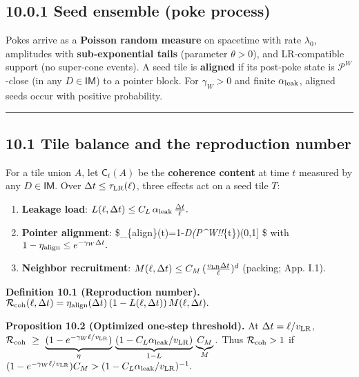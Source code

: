 \documentclass[
]{article}
\numberwithin{equation}{section}
\begin{document}
\hypertarget{seed-ensemble-poke-process}{%
\subsection{10.0.1 Seed ensemble (poke
process)}\label{seed-ensemble-poke-process}}

Pokes arrive as a \textbf{Poisson random measure} on spacetime with rate
\(\lambda_0\), amplitudes with \textbf{sub‑exponential tails} (parameter
\(\theta>0\)), and LR‑compatible support (no super‑cone events). A seed
tile is \textbf{aligned} if its post‑poke state is
\(\mathcal P^W\)-close (in any \(D\in\mathsf{IM}\)) to a pointer block.
For \(\gamma_W>0\) and finite \(\alpha_{\rm leak}\), aligned seeds occur
with positive probability.

\begin{center}\rule{0.5\linewidth}{0.5pt}\end{center}

\hypertarget{tile-balance-and-the-reproduction-number}{%
\subsection{10.1 Tile balance and the reproduction
number}\label{tile-balance-and-the-reproduction-number}}

For a tile union \(A\), let \(\mathsf C_t(A)\) be the \textbf{coherence
content} at time \(t\) measured by any \(D\in\mathsf{IM}\). Over
\(\Delta t\le \tau_{\rm LR}(\ell)\), three effects act on a seed tile
\(T\):

\begin{enumerate}
\def\labelenumi{\arabic{enumi}.}
\item
  \textbf{Leakage load}:
  \(L(\ell,\Delta t)\le C_L\,\alpha_{\rm leak}\,\tfrac{\Delta t}{\ell}.\)
\item
  \textbf{Pointer alignment}:
  \$\eta\_\{\rm align\}(\Delta t)=1-\delta\emph{D(\mathcal P\^{}W!\circ!\Phi}\{\Delta t\})\in(0,1{]}
  \$ with \(1-\eta_{\rm align}\le e^{-\gamma_W\Delta t}.\)
\item
  \textbf{Neighbor recruitment}:
  \(M(\ell,\Delta t)\le C_M\,(\tfrac{v_{\rm LR}\Delta t}{\ell})^d\)
  (packing; App. I.1).
\end{enumerate}

\textbf{Definition 10.1 (Reproduction number).}
\(\mathcal R_{\rm coh}(\ell,\Delta t)=\eta_{\rm align}(\Delta t)\,(1-L(\ell,\Delta t))\,M(\ell,\Delta t).\)

\textbf{Proposition 10.2 (Optimized one‑step threshold).} At
\(\Delta t=\ell/v_{\rm LR}\),
\(\mathcal R_{\rm coh}\ \ge\ \underbrace{(1-e^{-\gamma_W\ell/v_{\rm LR}})}_{\eta}\,\underbrace{(1-C_L\alpha_{\rm leak}/v_{\rm LR})}_{1-L}\,\underbrace{C_M}_{M}.\)
Thus \(\mathcal R_{\rm coh}>1\) if
\((1-e^{-\gamma_W\ell/v_{\rm LR}})C_M>(1-C_L\alpha_{\rm leak}/v_{\rm LR})^{-1}.\)
\end{document}
